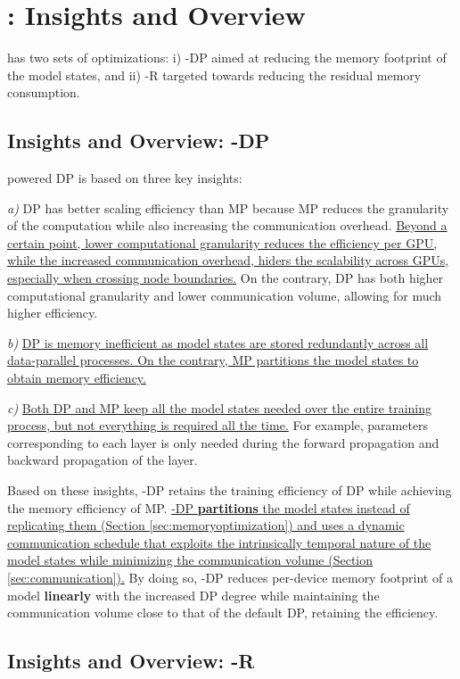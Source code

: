 
\section{\name: Insights and Overview}
\name has two sets of optimizations: i) \name-DP aimed at reducing the memory footprint of the model states, and ii) \name-R targeted towards reducing the residual memory consumption.

\subsection{Insights and Overview: \name-DP}
\name powered DP is based on three key insights:

{\it a)} DP has better scaling efficiency than MP because MP reduces the granularity of the computation while also increasing the communication overhead. \uline{Beyond a certain point, lower computational granularity reduces the efficiency per GPU, while the increased communication overhead, hiders the scalability across GPUs, especially when crossing node boundaries.} On the contrary, DP has both higher computational granularity and lower communication volume, allowing for much higher efficiency.

{\it b)} \uline{DP is memory inefficient as model states are stored redundantly across all data-parallel processes. On the contrary, MP partitions the model states to obtain memory efficiency.}

{\it c)} \uline{Both DP and MP keep all the model states needed over the entire training process, but not everything is required all the time.}  For example, parameters corresponding to each layer is only needed during the forward propagation and backward propagation of the layer.  

Based on these insights, \name-DP retains the training efficiency of DP while achieving the memory efficiency of MP. \uline{\name-DP \textbf{partitions} the model states instead of replicating them (Section \ref{sec:memoryoptimization}) and uses a dynamic communication schedule that exploits the intrinsically temporal nature of the model states while minimizing the communication volume (Section \ref{sec:communication}).} By doing so, \name-DP reduces per-device memory footprint of a model \textbf{linearly} with the increased DP degree while maintaining the communication volume close to that of the default DP, retaining the efficiency.

\subsection{Insights and Overview: \name-R}

